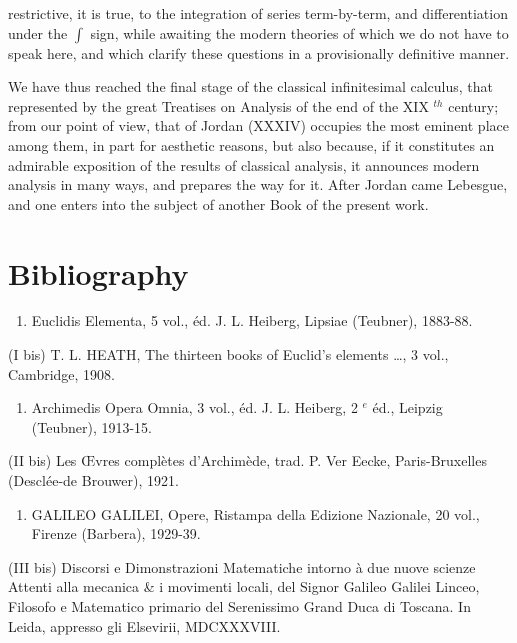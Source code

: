 restrictive, it is true, to the integration of series term-by-term, and differentiation under the \(\int\) sign, while awaiting the modern theories of which we do not have to speak here, and which clarify these questions in a provisionally definitive manner.

We have thus reached the final stage of the classical infinitesimal calculus, that represented by the great Treatises on Analysis of the end of the XIX \(^{th}\) century; from our point of view, that of Jordan (XXXIV) occupies the most eminent place among them, in part for aesthetic reasons, but also because, if it constitutes an admirable exposition of the results of classical analysis, it announces modern analysis in many ways, and prepares the way for it. After Jordan came Lebesgue, and one enters into the subject of another Book of the present work.

\section*{Bibliography}
{}

\begin{enumerate}
\def\labelenumi{(\Roman{enumi})}
\tightlist
\item
  Euclidis Elementa, 5 vol., éd. J. L. Heiberg, Lipsiae (Teubner), 1883-88.
\end{enumerate}

(I bis) T. L. HEATH, The thirteen books of Euclid's elements \ldots, 3 vol., Cambridge, 1908.

\begin{enumerate}
\def\labelenumi{(\Roman{enumi})}
\setcounter{enumi}{1}
\tightlist
\item
  Archimedis Opera Omnia, 3 vol., éd. J. L. Heiberg, 2 \(^{e}\) éd., Leipzig (Teubner), 1913-15.
\end{enumerate}

(II bis) Les Œvres complètes d'Archimède, trad. P. Ver Eecke, Paris-Bruxelles (Desclée-de Brouwer), 1921.

\begin{enumerate}
\def\labelenumi{(\Roman{enumi})}
\setcounter{enumi}{2}
\tightlist
\item
  GALILEO GALILEI, Opere, Ristampa della Edizione Nazionale, 20 vol., Firenze (Barbera), 1929-39.
\end{enumerate}

(III bis) Discorsi e Dimonstrazioni Matematiche intorno à due nuove scienze Attenti alla mecanica \& i movimenti locali, del Signor Galileo Galilei Linceo, Filosofo e Matematico primario del Serenissimo Grand Duca di Toscana. In Leida, appresso gli Elsevirii, MDCXXXVIII.


